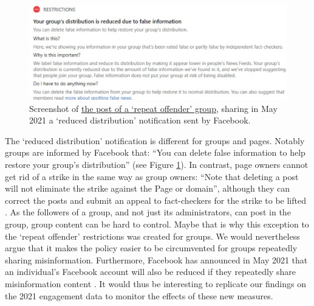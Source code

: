 \documentclass[review]{elsarticle}
\begin{document}
{\begin{figure}[!h]
\centering
\includegraphics[scale=0.24]{./../figure/screenshot_reduced_group.png}
\caption{
Screenshot of \href{https://www.facebook.com/groups/mcbowwow/posts/3893068180741848/}{the post of a `repeat offender' group}, sharing in May 2021 a `reduced distribution' notification sent by Facebook.
}
\label{screenshot_reduced_group}
\end{figure}

The `reduced distribution' notification is different for groups and pages. 
Notably groups are informed by Facebook that: ``You can delete false information to help restore your group's distribution'' (see Figure \ref{screenshot_reduced_group}).
In contrast, page owners cannot get rid of a strike in the same way as group owners: ``Note that deleting a post will not eliminate the strike against the Page or domain'', although they can correct the posts and submit an appeal to fact-checkers for the strike to be lifted \cite{FacebookCorrectRating}.
As the followers of a group, and not just its administrators, can post in the group, group content can be hard to control. 
Maybe that is why this exception to the `repeat offender' restrictions was created for groups. 
We would nevertheless argue that it makes the policy easier to be circumvented for groups repeatedly sharing misinformation.
Furthermore, Facebook has announced in May 2021 that an individual's Facebook account will also be reduced if they repeatedly share misinformation content \cite{FacebookReduceUsers}.
It would thus be interesting to replicate our findings on the 2021 engagement data to monitor the effects of these new measures.

}
\end{document}
